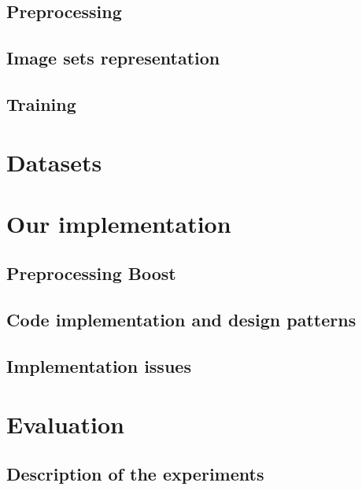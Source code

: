 \documentclass{beamer}
\begin{document}
\subsection{Preprocessing}
\begin{frame}
\end{frame}
\subsection{Image sets representation}
\begin{frame}
\end{frame}
\subsection{Training}
\begin{frame}
\end{frame}
\section{Datasets}
\section{Our implementation}
\begin{frame}
\end{frame}
\subsection{Preprocessing Boost}
\begin{frame}
\end{frame}
\subsection{Code implementation and design patterns}
\begin{frame}
\end{frame}
\subsection{Implementation issues}
\begin{frame}
\end{frame}
\section{Evaluation}
\subsection{Description of the experiments}
\begin{frame}
\end{frame}
\end{document}
